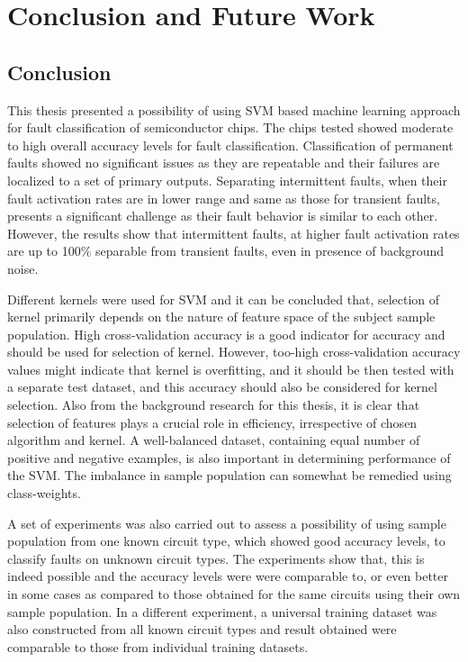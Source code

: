 \chapter{Conclusion and Future Work}
\label{chap:chapter7}
\section{Conclusion}

This thesis presented a possibility of using SVM based machine learning approach for fault classification of semiconductor chips. The chips tested showed moderate to high overall accuracy levels for fault classification. Classification of permanent faults showed no significant issues as they are repeatable and their failures are localized to a set of primary outputs. Separating intermittent faults, when their fault activation rates are in lower range and same as those for transient faults, presents a significant challenge as their fault behavior is similar to each other. However, the results show that intermittent faults, at higher fault activation rates are up to 100\% separable from transient faults, even in presence of background noise.


Different kernels were used for SVM and it can be concluded that, selection of kernel primarily depends on the nature of feature space of the subject sample population. High cross-validation accuracy is a good indicator for accuracy and should be used for selection of kernel. However, too-high cross-validation accuracy values might indicate that kernel is overfitting, and it should be then tested with a separate test dataset, and this accuracy should also be considered for kernel selection. Also from the background research for this thesis, it is clear that selection of features plays a crucial role in efficiency, irrespective of chosen algorithm and kernel. A well-balanced dataset, containing equal number of positive and negative examples, is also important in determining performance of the SVM. The imbalance in sample population can somewhat be remedied using class-weights.

A set of experiments was also carried out to assess a possibility of using sample population from one known circuit type, which showed good accuracy levels, to classify faults on unknown circuit types. The experiments show that, this is indeed possible and the accuracy levels were were comparable to, or even better in some cases as compared to those obtained for the same circuits using their own sample population. In a different experiment,  a universal training dataset was also constructed from all known circuit types and result obtained were comparable to those from individual training datasets.

